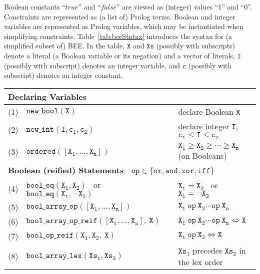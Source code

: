 \documentclass{tlp}
\newcommand{\true}{\texttt{true}}
\newcommand{\false}{\mathit{false}}
\renewcommand{\true}{\mathit{true}}
\newcommand{\bee}{\textsf{BEE}}
\begin{document}
Boolean constants ``$\true$'' and ``$\false$'' are viewed as
(integer) values ``1'' and ``0''.
Constraints are represented as (a list of) Prolog terms. Boolean and
integer variables are represented as Prolog variables, which may be
instantiated when simplifying constraints.
Table~\ref{tab:beeStntax} introduces the syntax for (a simplified
subset of) \bee. In the table, $\mathtt{X}$ and $\mathtt{Xs}$ (possibly
with subscripts) denote a literal (a Boolean variable  or 
its negation) and a vector of literals, $\mathtt{I}$ (possibly with subscript)
denotes an integer variable, and $\mathtt{c}$ (possibly with
subscript) denotes an integer constant.  



\begin{table}[t]
  \centering
\begin{tabular}{rlll}
\hline\hline
\multicolumn{4}{l}{\bf\small Declaring Variables}\\
\hline
(1) &$\mathtt{new\_bool(X)}$ &\qquad\qquad &declare Boolean \texttt{X}
\\
(2) &$\mathtt{new\_int(I,c_1,c_2)}$ & & 
               declare integer \texttt{I}, $\mathtt{c_1\leq I\leq c_2}$ \\
(3) &    $\mathtt{ordered([X_1,\ldots,X_n])}$ &
          &
          $\mathtt{X_1\geq X_2\geq\cdots\geq X_n}$ (on Booleans)\\
\hline
\multicolumn{4}{l}{\bf\small Boolean (reified) Statements~ 
       \hfill $\mathtt{op\in\{or, and, xor, iff\}}$}\\
\hline
(4) &    $\mathtt{bool\_eq(X_1,X_2)}$ ~or~ $\mathtt{bool\_eq(X_1,-X_2)}$&
          $\mathtt{}$&
          $\mathtt{X_1 = X_2}$ ~or~ $\mathtt{X_1 = \neg X_2}$\\
(5) &    $\mathtt{bool\_array\_op([X_1,\ldots,X_n])}$ &
          $\mathtt{}$&
          $\mathtt{X_1 ~op~ X_2 \cdots op~ X_n}$\\
(6) &    $\mathtt{bool\_array\_op\_reif([X_1,\ldots,X_n],~X)}$ &
          $\mathtt{}$&
          $\mathtt{X_1 ~op~ X_2 \cdots op~ X_n\Leftrightarrow X}$\\
(7) &    $\mathtt{bool\_op\_reif(X_1,X_2,~X)}$ &
          $\mathtt{}$&
          $\mathtt{X_1 ~op~ X_2\Leftrightarrow X}$\\
(8) &     $\mathtt{bool\_array\_lex(Xs_1,Xs_2)}$ &$\mathtt{}$&
             $\mathtt{Xs_1}$ precedes $\mathtt{Xs_2}$ in the lex order\\
\hline


\end{tabular}
\end{table}
\end{document}
